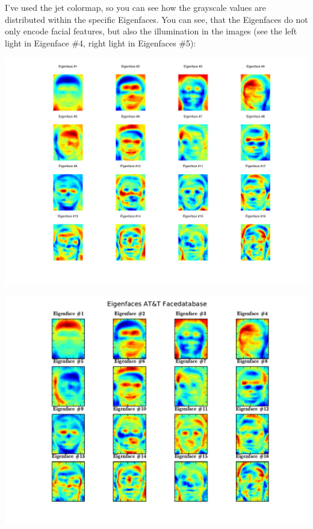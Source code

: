 \ifx\python\undefined
	
\else
	
\fi

I've used the jet colormap, so you can see how the grayscale values are distributed within the specific Eigenfaces. You can see, that the Eigenfaces do not only encode facial features, but also the illumination in the images (see the left light in Eigenface \#4, right light in Eigenfaces \#5):

\ifx\python\undefined
\begin{center}
	\includegraphics[scale=0.6]{img/eigenfaces/octave_pca_eigenfaces}
\end{center}
\else
	\begin{center}
		\includegraphics[scale=0.6]{img/eigenfaces/python_pca_eigenfaces}
	\end{center}
\fi

